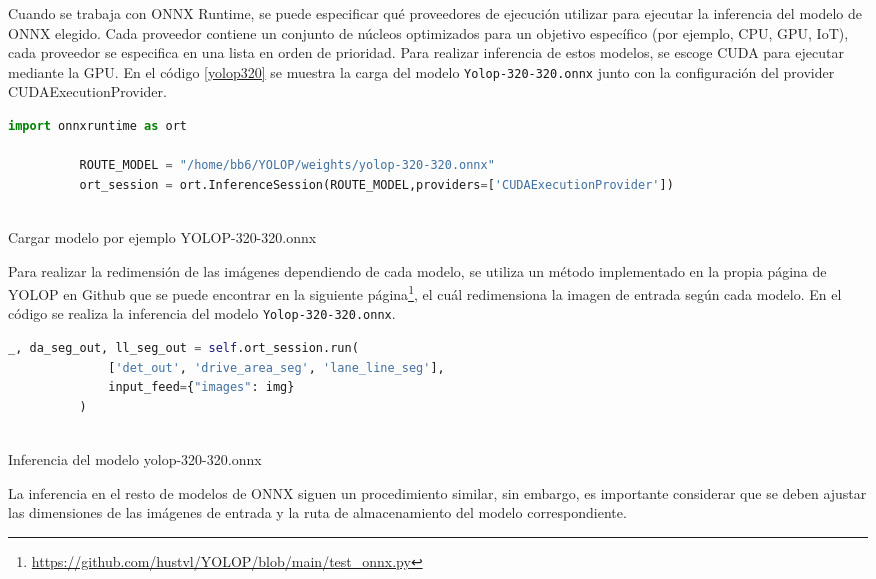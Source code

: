       Cuando se trabaja con ONNX Runtime, se puede especificar qué proveedores de ejecución utilizar para ejecutar la inferencia del modelo de ONNX elegido. Cada proveedor 
      contiene un conjunto de núcleos optimizados para un objetivo específico (por ejemplo, CPU, GPU, IoT), cada proveedor se especifica en una lista en orden de prioridad. Para realizar 
      inferencia de estos modelos, se escoge CUDA para ejecutar mediante la GPU. En el código \ref{yolop320} se muestra la carga del modelo \texttt{Yolop-320-320.onnx} junto con la configuración
      del provider CUDAExecutionProvider. 
      
      \begin{code}[h]
        \begin{lstlisting}[language=Python]
          import onnxruntime as ort

          ROUTE_MODEL = "/home/bb6/YOLOP/weights/yolop-320-320.onnx"
          ort_session = ort.InferenceSession(ROUTE_MODEL,providers=['CUDAExecutionProvider'])
      
        \end{lstlisting}
        \caption[Cargar modelo]{Cargar modelo por ejemplo YOLOP-320-320.onnx}
        \label{yolop320}
        \end{code}  

        Para realizar la redimensión de las imágenes dependiendo de cada modelo, se utiliza un método implementado en la propia página de YOLOP en Github 
        que se puede encontrar en la siguiente página\footnote{\url{https://github.com/hustvl/YOLOP/blob/main/test_onnx.py}}, el cuál redimensiona la imagen de entrada según cada modelo. En el código 
        \label{cod:Inferencia_onnx} se realiza la inferencia del modelo \texttt{Yolop-320-320.onnx}. 

        \begin{code}[h]
          \begin{lstlisting}[language=Python]
            _, da_seg_out, ll_seg_out = self.ort_session.run(
              ['det_out', 'drive_area_seg', 'lane_line_seg'],
              input_feed={"images": img}
          )
        
          \end{lstlisting}
          \caption[Inferencia del modelo yolop-320-320.onnx]{Inferencia del modelo yolop-320-320.onnx}
          \label{cod:Inferencia_onnx}
          \end{code}  

        La inferencia en el resto de modelos de ONNX siguen un procedimiento similar, sin embargo, es importante considerar que se deben ajustar las dimensiones de las imágenes de entrada
        y la ruta de almacenamiento del modelo correspondiente.


